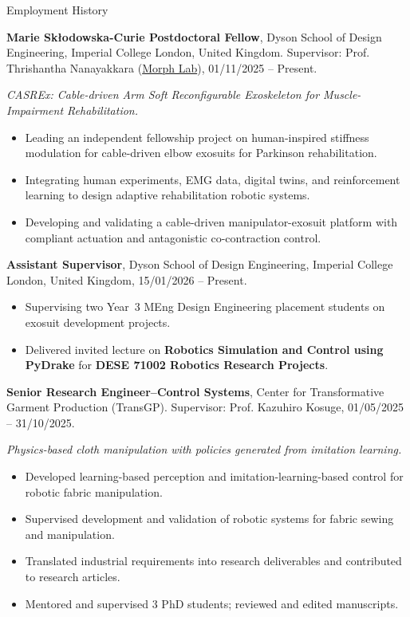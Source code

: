 

\begin{rubric}{Employment History}

\entry*[2025 -- Present]%
	\textbf{Marie Skłodowska-Curie Postdoctoral Fellow}, Dyson School of Design Engineering, Imperial College London, United Kingdom. Supervisor: Prof. Thrishantha Nanayakkara (\href{https://www.imperial.ac.uk/morph-lab/}{Morph Lab}), 01/11/2025 -- Present.
    \par \textit{CASREx: Cable-driven Arm Soft Reconfigurable Exoskeleton for Muscle-Impairment Rehabilitation.}
    \begin{itemize}
    \item Leading an independent fellowship project on human-inspired stiffness modulation for cable-driven elbow exosuits for Parkinson rehabilitation.
    \item Integrating human experiments, EMG data, digital twins, and reinforcement learning to design adaptive rehabilitation robotic systems.
    \item Developing and validating a cable-driven manipulator-exosuit platform with compliant actuation and antagonistic co-contraction control.
    \end{itemize}

\entry*[2026 -- Present]%
	\textbf{Assistant Supervisor}, Dyson School of Design Engineering, Imperial College London, United Kingdom, 15/01/2026 -- Present.
    \begin{itemize}
    \item Supervising two Year~3 MEng Design Engineering placement students on exosuit development projects.
	\item Delivered invited lecture on \textbf{Robotics Simulation and Control using PyDrake} for \textbf{DESE 71002 Robotics Research Projects}.
    \end{itemize}

\entry*[2024 -- 2025]%
	\textbf{Senior Research Engineer--Control Systems}, Center for Transformative Garment Production (TransGP). Supervisor: Prof. Kazuhiro Kosuge, 01/05/2025 -- 31/10/2025.
    \par \textit{Physics-based cloth manipulation with policies generated from imitation learning.}
    \begin{itemize}
        \item Developed learning-based perception and imitation-learning-based control for robotic fabric manipulation.
        \item Supervised development and validation of robotic systems for fabric sewing and manipulation.
        \item Translated industrial requirements into research deliverables and contributed to research articles.
        \item Mentored and supervised 3 PhD students; reviewed and edited manuscripts.
    \end{itemize}



\end{rubric}
